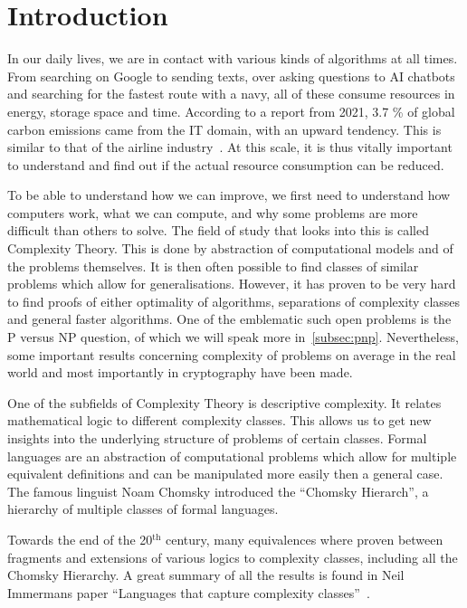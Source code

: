 \chapter{Introduction}\label{ch:intro}

In our daily lives, we are in contact with various kinds of algorithms at all times.
From searching on Google to sending texts, over asking questions to AI chatbots and searching for the fastest route with a navy, all of these consume resources in energy, storage space and time.
According to a report from 2021, 3.7 \% of global carbon emissions came from the IT domain, with an upward tendency.
This is similar to that of the airline industry~\cite{webFootprint}.
At this scale, it is thus vitally important to understand and find out if the actual resource consumption can be reduced.

To be able to understand how we can improve, we first need to understand how computers work, what we can compute, and why some problems are more difficult than others to solve.
The field of study that looks into this is called Complexity Theory.
This is done by abstraction of computational models and of the problems themselves.
It is then often possible to find classes of similar problems which allow for generalisations.
However, it has proven to be very hard to find proofs of either optimality of algorithms, separations of complexity classes and general faster algorithms.
One of the emblematic such open problems is the P versus NP question, of which we will speak more in~\cref{subsec:pnp}.
Nevertheless, some important results concerning complexity of problems on average in the real world and most importantly in cryptography have been made.

One of the subfields of Complexity Theory is descriptive complexity.
It relates mathematical logic to different complexity classes.
This allows us to get new insights into the underlying structure of problems of certain classes.
Formal languages are an abstraction of computational problems which allow for multiple equivalent definitions and can be manipulated more easily then a general case.
The famous linguist Noam Chomsky introduced the ``Chomsky Hierarch'', a hierarchy of multiple classes of formal languages.

Towards the end of the 20$^{\text{th}}$ century, many equivalences where proven between fragments and extensions of various logics to complexity classes, including all the Chomsky Hierarchy.
A great summary of all the results is found in Neil Immermans paper ``Languages that capture complexity classes''~\cite{Immerman1987}.

